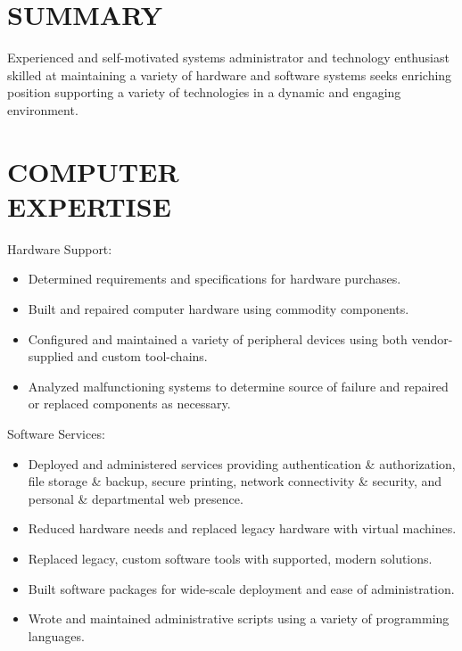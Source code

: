 \documentclass[line,margin]{res}
\begin{document}

\address{3301 Elliot Ave S. Apt 1, Minneapolis, MN 55407}
\address{deisum@gmail.com 612.205.9789}
 
\begin{resume}
 
\section{SUMMARY}
    Experienced and self-motivated systems administrator and technology
    enthusiast skilled at maintaining a variety of hardware and software
    systems seeks enriching position supporting a variety of technologies
    in a dynamic and engaging environment.

\section{COMPUTER \\ EXPERTISE}

    Hardware Support:
    \vspace{2 mm}
    \begin{itemize} \itemsep -1pt %
        \item Determined requirements and specifications for hardware purchases.
        \item Built and repaired computer hardware using commodity components.
        \item Configured and maintained a variety of peripheral devices
        using both vendor-supplied and custom tool-chains.
        \item Analyzed malfunctioning systems to determine source of
        failure and repaired or replaced components as necessary.
    \end{itemize}

    Software Services:
    \vspace{2 mm}
    \begin{itemize} \itemsep -1pt %
        \item Deployed and administered services providing authentication
        \& authorization, file storage \& backup, secure printing, network
        connectivity \& security, and personal \& departmental web presence.
        \item Reduced hardware needs and replaced legacy hardware with
        virtual machines.
        \item Replaced legacy, custom software tools with supported,
        modern solutions.
        \item Built software packages for wide-scale deployment and ease
        of administration.
        \item Wrote and maintained administrative scripts using a variety
        of programming languages.
    \end{itemize}


\end{resume}
\end{document}
